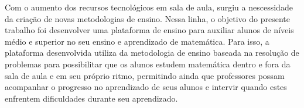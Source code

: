 Com o aumento dos recursos tecnológicos em sala de aula, surgiu a nescessidade da criação de novas metodologias de ensino. Nessa linha, o objetivo do presente trabalho foi desenvolver uma plataforma de ensino para auxiliar alunos de níveis médio e superior no seu ensino e aprendizado de matemática. Para isso, a plataforma desenvolvida utiliza da metodologia de ensino baseada na resolução de problemas para possibilitar que os alunos estudem matemática dentro e fora da sala de aula e em seu próprio ritmo, permitindo ainda que professores possam acompanhar o progresso no aprendizado de seus alunos e intervir quando estes enfrentem dificuldades durante seu aprendizado. 


